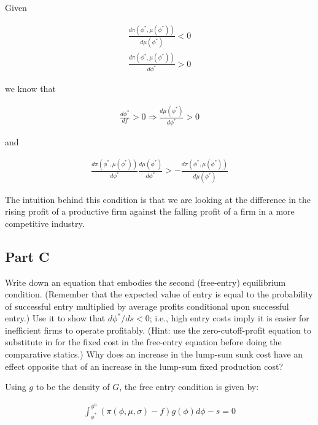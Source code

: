 \documentclass[10pt]{article}
\begin{document}
Given 

\begin{align}
    \frac{d \pi\left(\phi^*, \mu\left(\phi^*\right)\right)}{d \mu\left(\phi^*\right)}<0 \\
    \frac{d \pi\left(\phi^*, \mu\left(\phi^*\right)\right)}{d \phi^*}>0
\end{align}

we know that

\begin{align}
    \frac{d \phi^*}{d f}>0 \Rightarrow \frac{d \mu\left(\phi^*\right)}{d \phi^*}>0
\end{align}

and 

\begin{align}
    \frac{d \pi\left(\phi^*, \mu\left(\phi^*\right)\right)}{d \phi^*} \frac{d \mu\left(\phi^*\right)}{d \phi^*}>-\frac{d \pi\left(\phi^*, \mu\left(\phi^*\right)\right)}{d \mu\left(\phi^*\right)}
\end{align}


The intuition behind this condition is that we are 
looking at the difference in the rising profit 
of a productive firm against the falling profit
of a firm in a more competitive industry. 


\subsection{Part C}

Write down an equation that embodies the second (free-entry) 
equilibrium condition. (Remember that the expected value of entry is equal 
to the probability of successful entry multiplied by average profits 
conditional upon successful entry.) Use it to show that $d \phi^* / d s<0$; 
i.e., high entry costs imply it is easier for inefficient firms to operate 
profitably. (Hint: use the zero-cutoff-profit equation to substitute in for 
the fixed cost in the free-entry equation before doing the comparative statics.) Why does an increase in the lump-sum sunk cost have an effect opposite that of an increase in the lump-sum fixed production cost?

\hrulefill\hspace{0.5em}\dotfill\hspace{0.5em}\hrulefill

Using $g$ to be the density of $G$,
the free entry condition is given by:

\begin{align}
    \int_{\phi^*}^{\phi^u}(\pi(\phi, \mu, \sigma)-f) g(\phi) d \phi-s=0
\end{align}
\end{document}
